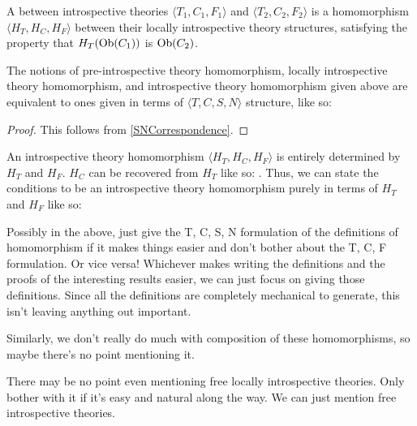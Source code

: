 \begin{definition}
A  between introspective theories $\langle T_1, C_1, F_1 \rangle$ and $\langle T_2, C_2, F_2 \rangle$ is a homomorphism $\langle H_T, H_C, H_F \rangle$ between their locally introspective theory structures, satisfying the property that $H_T(\operatorname{Ob}(C_1))$ is $\operatorname{Ob}(C_2)$.
\end{definition}

\begin{theorem}
The notions of pre-introspective theory homomorphism, locally introspective theory homomorphism, and introspective theory homomorphism given above are equivalent to ones given in terms of $\langle T, C, S, N \rangle$ structure, like so: \TODO
\end{theorem}
\begin{proof}
This follows from \cref{SNCorrespondence}.
\end{proof}

\begin{theorem}
An introspective theory homomorphism $\langle H_T, H_C, H_F \rangle$ is entirely determined by $H_T$ and $H_F$. $H_C$ can be recovered from $H_T$ like so: \TODO. Thus, we can state the conditions to be an introspective theory homomorphism purely in terms of $H_T$ and $H_F$ like so: \TODO
\end{theorem}

\begin{TODOblock}
Possibly in the above, just give the T, C, S, N formulation of the definitions of homomorphism if it makes things easier and don't bother about the T, C, F formulation. Or vice versa! Whichever makes writing the definitions and the proofs of the interesting results easier, we can just focus on giving those definitions. Since all the definitions are completely mechanical to generate, this isn't leaving anything out important.

Similarly, we don't really do much with composition of these homomorphisms, so maybe there's no point mentioning it.

There may be no point even mentioning free locally introspective theories. Only bother with it if it's easy and natural along the way. We can just mention free introspective theories.
\end{TODOblock}